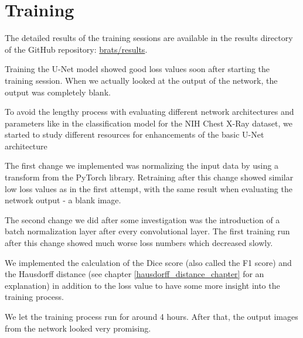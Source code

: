 \section{Training}
The detailed results of the training sessions are available in the results directory of the GitHub repository: \href{https://github.com/andef4/thesis-code/tree/master/brats/results/}{brats/results}.

Training the U-Net model showed good loss values soon after starting the training session. When we actually looked at the output of the network, the output was completely blank.

To avoid the lengthy process with evaluating different network architectures and parameters like in the classification model for the NIH Chest X-Ray dataset, we started to study different resources for enhancements of the basic U-Net architecture

The first change we implemented was normalizing the input data by using a transform from the PyTorch library.
Retraining after this change showed similar low loss values as in the first attempt, with the same result when evaluating the network output - a blank image.

The second change we did after some investigation was the introduction of a batch normalization layer after every convolutional layer. The first training run after this change showed much worse loss numbers which decreased slowly.

We implemented the calculation of the Dice score (also called the F1 score) and the Hausdorff distance (see chapter \ref{hausdorff_distance_chapter} for an explanation) in addition to the loss value to have some more insight into the training process.

We let the training process run for around 4 hours. After that, the output images from the network looked very promising.

